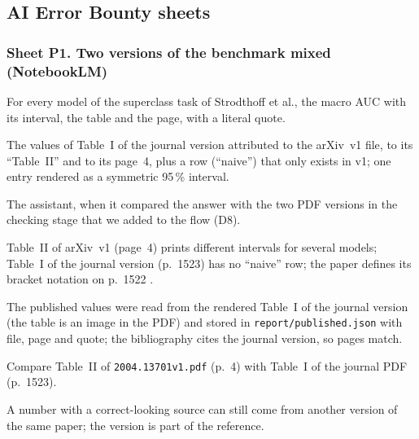 \subsection*{AI Error Bounty sheets}

\subsubsection*{Sheet P1. Two versions of the benchmark mixed (NotebookLM)}
\begin{description}[style=nextline,leftmargin=1.2em]
  \item[Prompt] For every model of the superclass task of Strodthoff et al., the macro AUC with its
        interval, the table and the page, with a literal quote.
  \item[Faulty response] The values of Table~I of the journal version attributed to the arXiv~v1 file,
        to its ``Table~II'' and to its page~4, plus a row (``naive'') that only exists in v1; one entry
        rendered as a symmetric 95\,\% interval.
  \item[Detected by] The assistant, when it compared the answer with the two PDF versions in the
        checking stage that we added to the flow (D8).
  \item[Proof] Table~II of arXiv~v1 (page~4) prints different intervals for several models; Table~I of
        the journal version (p.~1523) has no ``naive'' row; the paper defines its bracket notation on
        p.~1522 \cite{strodthoff2021deep}.
  \item[Correction] The published values were read from the rendered Table~I of the journal version
        (the table is an image in the PDF) and stored in \texttt{report/published.json} with file, page
        and quote; the bibliography cites the journal version, so pages match.
  \item[Reproduction] Compare Table~II of \texttt{2004.13701v1.pdf} (p.~4) with Table~I of the journal
        PDF (p.~1523).
  \item[Reflection] A number with a correct-looking source can still come from another version of the
        same paper; the version is part of the reference.
\end{description}

